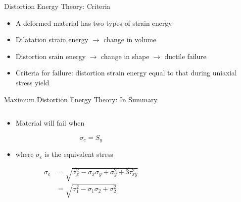 \documentclass[10pt, svgnames]{beamer}
\begin{document}
\begin{frame}[label={sec:org78f3a9b}]{Distortion Energy Theory: Criteria}
\begin{itemize}
\item A deformed material has two types of strain energy
\item Dilatation strain energy \(\rightarrow\) change in volume
\item Distortion srain energy \(\rightarrow\) change in shape \(\rightarrow\) ductile failure
\item Criteria for failure: distortion strain energy equal to that during uniaxial stress yield
\end{itemize}
\end{frame}


\begin{frame}[label={sec:orge08db55}]{Maximum Distortion Energy Theory: In Summary}
\begin{columns}
\begin{column}{0.4\columnwidth}
\begin{itemize}
\item Material will fail when
\end{itemize}
\begin{equation*}
\sigma_e = S_y
\end{equation*}
\begin{itemize}
\item where \(\sigma_e\) is the equivalent stress
\end{itemize}
\begin{align*}
\sigma_e &= \sqrt{\sigma_x^2 - \sigma_x\sigma_y + \sigma_y^2 + 3\tau_{xy}^2} \\
&= \sqrt{\sigma_1^2 - \sigma_1\sigma_2 + \sigma_2^2}
\end{align*}
\end{column}

\begin{column}{0.6\columnwidth}
\end{column}
\end{columns}
\end{frame}
\end{document}
